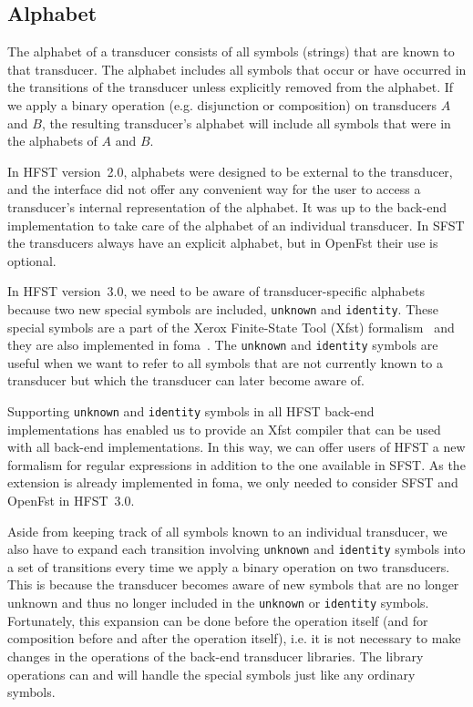 \documentclass{llncs}
\begin{document}
\subsection{Alphabet}
The alphabet of a transducer consists of all symbols (strings) that are
known to that transducer. The alphabet includes all symbols that occur 
or have occurred in the transitions of the transducer unless explicitly
removed from the alphabet. 
If we apply a binary operation (e.g. disjunction or composition) on 
transducers $A$ and $B$, the resulting transducer's alphabet will include
all symbols that were in the alphabets of $A$ and $B$. 

In HFST version~2.0, alphabets were designed to be external to the transducer,
and the interface did not offer any convenient way for the user to access a 
transducer's internal representation of the alphabet. It was up to the back-end 
implementation to take care of the alphabet of an individual transducer. In SFST 
the transducers always have an explicit alphabet, but in OpenFst their use is optional.
 
In HFST version~3.0, we need to be aware of transducer-specific alphabets 
because two new special symbols are included, \texttt{unknown} and \texttt{identity}. 
These special symbols are a part of the Xerox Finite-State Tool (Xfst) 
formalism~\cite{beesley/2003} and they are also implemented in
foma~\cite{hulden/2009}. The \texttt{unknown} and \texttt{identity} symbols 
are useful when we want to refer to all symbols that are not currently 
known to a transducer but which the transducer can later become aware of. 

Supporting \texttt{unknown} and \texttt{identity} symbols in all HFST back-end
implementations has enabled us to provide an Xfst compiler that can be used
with all back-end implementations. 
In this way, we can offer users of HFST a new 
formalism for regular expressions in addition to the one available in SFST. 
As the extension is already implemented in foma, we only needed to 
consider SFST and OpenFst in HFST~3.0.

Aside from keeping track of all symbols known to an individual transducer, we also
have to expand each transition involving \texttt{unknown} and 
\texttt{identity} symbols into a set of transitions every time we apply 
a binary operation on two transducers. 
This is because the transducer becomes aware of new symbols that are
no longer unknown and thus no longer included in the \texttt{unknown} or 
\texttt{identity} symbols.
Fortunately, this expansion can be done before the operation itself 
(and for composition before and after the operation itself), i.e. it is  
not necessary to make changes in the operations of the back-end transducer
libraries. 
The library operations can and will handle the special symbols just
like any ordinary symbols. 
\end{document}
